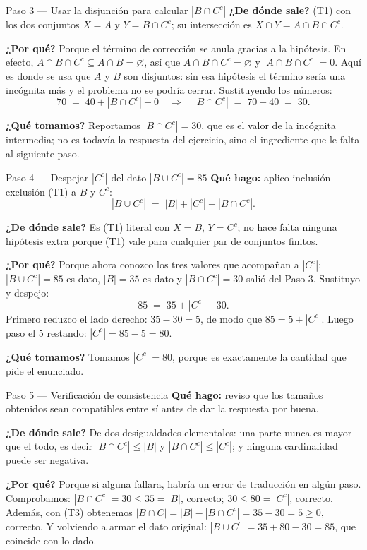 \documentclass[11pt]{article}
\begin{document}
\begin{sol}
\begin{paso}{Paso 3 --- Usar la disjunción para calcular $|B\cap C^{c}|$}
\textbf{¿De dónde sale?} (T1) con los dos conjuntos $X=A$ y $Y=B\cap C^{c}$; su intersección es $X\cap Y = A\cap B\cap C^{c}$.

\textbf{¿Por qué?} Porque el término de corrección se anula gracias a la hipótesis. En efecto, $A\cap B\cap C^{c}\subseteq A\cap B=\varnothing$, así que $A\cap B\cap C^{c}=\varnothing$ y $|A\cap B\cap C^{c}|=0$. Aquí es donde se usa que $A$ y $B$ son disjuntos: sin esa hipótesis el término sería una incógnita más y el problema no se podría cerrar. Sustituyendo los números:
\[
70 \;=\; 40 + |B\cap C^{c}| - 0
\quad\Longrightarrow\quad
|B\cap C^{c}| \;=\; 70 - 40 \;=\; 30.
\]

\textbf{¿Qué tomamos?} Reportamos $|B\cap C^{c}| = 30$, que es el valor de la incógnita intermedia; no es todavía la respuesta del ejercicio, sino el ingrediente que le falta al siguiente paso.
\end{paso}

\begin{paso}{Paso 4 --- Despejar $|C^{c}|$ del dato $|B\cup C^{c}|=85$}
\textbf{Qué hago:} aplico inclusión--exclusión (T1) a $B$ y $C^{c}$:
\[
|B\cup C^{c}| \;=\; |B| + |C^{c}| - |B\cap C^{c}|.
\]

\textbf{¿De dónde sale?} Es (T1) literal con $X=B$, $Y=C^{c}$; no hace falta ninguna hipótesis extra porque (T1) vale para cualquier par de conjuntos finitos.

\textbf{¿Por qué?} Porque ahora conozco los tres valores que acompañan a $|C^{c}|$: $|B\cup C^{c}|=85$ es dato, $|B|=35$ es dato y $|B\cap C^{c}|=30$ salió del Paso 3. Sustituyo y despejo:
\[
85 \;=\; 35 + |C^{c}| - 30.
\]
Primero reduzco el lado derecho: $35-30=5$, de modo que $85 = 5 + |C^{c}|$. Luego paso el $5$ restando: $|C^{c}| = 85 - 5 = 80$.

\textbf{¿Qué tomamos?} Tomamos $|C^{c}| = 80$, porque es exactamente la cantidad que pide el enunciado.
\end{paso}

\begin{paso}{Paso 5 --- Verificación de consistencia}
\textbf{Qué hago:} reviso que los tamaños obtenidos sean compatibles entre sí antes de dar la respuesta por buena.

\textbf{¿De dónde sale?} De dos desigualdades elementales: una parte nunca es mayor que el todo, es decir $|B\cap C^{c}|\le |B|$ y $|B\cap C^{c}|\le |C^{c}|$; y ninguna cardinalidad puede ser negativa.

\textbf{¿Por qué?} Porque si alguna fallara, habría un error de traducción en algún paso. Comprobamos: $|B\cap C^{c}|=30 \le 35 = |B|$, correcto; $30 \le 80 = |C^{c}|$, correcto. Además, con (T3) obtenemos $|B\cap C| = |B| - |B\cap C^{c}| = 35-30 = 5 \ge 0$, correcto. Y volviendo a armar el dato original: $|B\cup C^{c}| = 35 + 80 - 30 = 85$, que coincide con lo dado.
\end{paso}

\end{sol}
\end{document}
